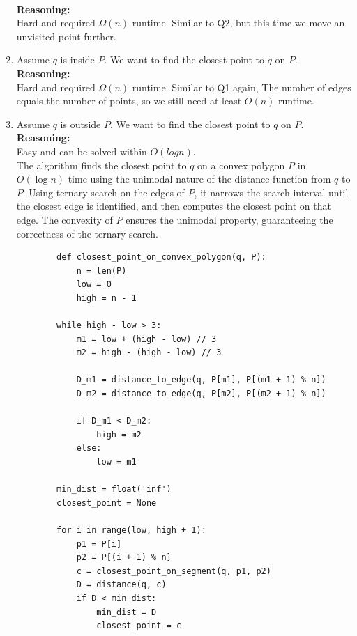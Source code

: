 \documentclass{article}
\begin{document}
\begin{enumerate}
    \\
    \textbf{Reasoning: }
    \\
    Hard and required $\Omega(n)$ runtime. Similar to Q2, but this time we move an unvisited point further.
    \item Assume $q$ is inside $P$. We want to find the closest point to $q$ on $P$.
    \\
    \textbf{Reasoning: }
    \\
    Hard and required $\Omega(n)$ runtime. Similar to Q1 again, The number of edges equals the number of points, so we still need at least $O(n)$ runtime.
    \item Assume $q$ is outside $P$. We want to find the closest point to $q$ on $P$.
    \\
    \textbf{Reasoning: }
    \\
    Easy and can be solved within $O(logn)$. 
    \\
    The algorithm finds the closest point to \( q \) on a convex polygon \( P \) in \( O(\log n) \) time using the unimodal nature of the distance function from \( q \) to \( P \). 
    Using ternary search on the edges of \( P \), it narrows the search interval until the closest edge is identified, and then computes the closest point on that edge. 
    The convexity of \( P \) ensures the unimodal property, guaranteeing the correctness of the ternary search.
    
    \begin{verbatim}
        def closest_point_on_convex_polygon(q, P):
            n = len(P)
            low = 0
            high = n - 1

        while high - low > 3:
            m1 = low + (high - low) // 3
            m2 = high - (high - low) // 3

            D_m1 = distance_to_edge(q, P[m1], P[(m1 + 1) % n])
            D_m2 = distance_to_edge(q, P[m2], P[(m2 + 1) % n])

            if D_m1 < D_m2:
                high = m2
            else:
                low = m1

        min_dist = float('inf')
        closest_point = None

        for i in range(low, high + 1):
            p1 = P[i]
            p2 = P[(i + 1) % n]
            c = closest_point_on_segment(q, p1, p2)
            D = distance(q, c)
            if D < min_dist:
                min_dist = D
                closest_point = c


\end{verbatim}
\end{enumerate}
\end{document}
